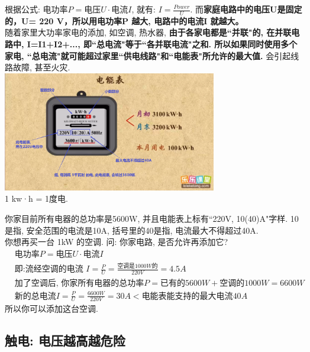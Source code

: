 \documentclass[UTF8]{ctexart}
\begin{document}
	根据公式: $\text{电功率}P=\text{电压}U\cdot \text{电流}I$, 就有: $I=\frac{Power} {U}$. 而\textbf{家庭电路中的电压U是固定的，U= 220 V，所以用电功率P 越大, 电路中的电流I 就越大。} \\
	
	随着家里大功率家电的添加, 如空调, 热水器, \textbf{由于各家电都是``并联"的, 在并联电路中, I=I1+I2+..., 即``总电流"等于``各并联电流"之和. 所以如果同时使用多个家电, ``总电流"就可能超过家里``供电线路"和``电能表"所允许的最大值.} 会引起线路故障, 甚至火灾. \\
	
		\includegraphics[width=0.7\textwidth]{img/0073.png} \\
		1 kw·h = 1度电. \\
	
	
	\begin{tcolorbox}[title = {例},boxrule={0.1em},colframe={black!10}, colback={black!3},colbacktitle={black!10},coltitle={black}]
	你家目前所有电器的总功率是5600W, 并且电能表上标有``220V, 10(40)A"字样. 10是指, 安全范围的电流是10A, 括号里的40是指, 电流最大不得超过40A.  \\
	你想再买一台 1kW 的空调. 问: 你家电路, 是否允许再添加它? 
	\begin{align*}
			&\text{电功率}P=\text{电压}U\cdot \text{电流}I\\
		&\text{即:流经空调的电流\ }I=\frac{P}{U}=\frac{\text{空调是}1000W\text{的}}{220V}=4.5A\\
		&\text{加了空调后,\ 你家所有电器的总功率}P=\text{已有的}5600W+\text{空调的}1000W=6600W\\
		&\text{新的总电流}I=\frac{P}{U}=\frac{6600W}{220V}=30A<\text{电能表能支持的最大电流}40A		
	\end{align*}
所以你可以添加这台空调.	
	\end{tcolorbox}

\vspace{1em} 


\subsection{触电: 电压越高越危险}
\end{document}
